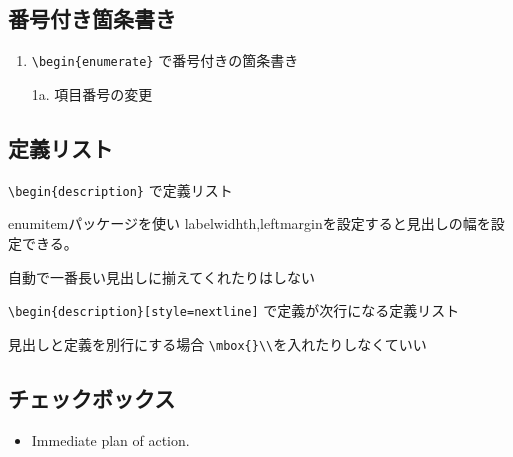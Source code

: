 \documentclass[draft]{jlreq} %
\begin{document}
\subsection{番号付き箇条書き}
\begin{enumerate}
 \item \verb|\begin{enumerate}| で番号付きの箇条書き
 \item[1a.] 項目番号の変更
\end{enumerate}

\subsection{定義リスト}
\begin{description}[labelwidth=10\zw,leftmargin=10\zw]
 \item[定義リスト] \verb|\begin{description}| で定義リスト
 \item[見出し] enumitemパッケージを使い labelwidhth,leftmarginを設定すると見出しの幅を設定できる。
 \item[とっても長い見出し] 自動で一番長い見出しに揃えてくれたりはしない
\end{description}

\begin{description}[style=nextline]
 \item[定義リスト] \verb|\begin{description}[style=nextline]| で定義が次行になる定義リスト
 \item[見出し] 見出しと定義を別行にする場合 \verb|\mbox{}\\|を入れたりしなくていい
\end{description}

\subsection{チェックボックス}

\newcommand{\cmark}{\ding{51}}%
\newcommand{\xmark}{\ding{55}}%
\newcommand{\done}{\rlap{$\square$}{\raisebox{2pt}{\large\hspace{1pt}\cmark}}\hspace{-2.5pt}}
\newcommand{\wontfix}{\rlap{$\square$}{\large\hspace{1pt}\xmark}}

\begin{itemize}
  \item Immediate plan of action.
\end{itemize}
\end{document}
